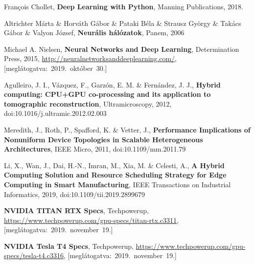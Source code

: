\begin{thebibliography}{9}
	François Chollet,
	\textbf{Deep Learning with Python},
	Manning Publications,
	2018.

	Altrichter Márta \& Horváth Gábor \& Pataki Béla \& Strausz György \& Takács Gábor \& Valyon József,
	\textbf{Neurális hálózatok},
	Panem,
	2006


	Michael A. Nielsen,
	\textbf{Neural Networks and Deep Learning},
	Determination Press,
	2015,
	{\footnotesize\url{http://neuralnetworksanddeeplearning.com/}},
	\mbox{[meglátogatva:~2019.~október~30.]}

	Agulleiro, J. I., Vázquez, F., Garzón, E. M. \& Fernández, J. J., \textbf{Hybrid computing: CPU+GPU co-processing and its application to tomographic reconstruction},
	Ultramicroscopy,
	2012,
	doi:10.1016/j.ultramic.2012.02.003 

	Meredith, J., Roth, P., Spafford, K. \& Vetter, J.,
	\textbf{Performance Implications of Nonuniform Device Topologies in Scalable Heterogeneous Architectures},
	IEEE Micro,
	2011,
	doi:10.1109/mm.2011.79 

	Li, X., Wan, J., Dai, H.-N., Imran, M., Xia, M. \& Celesti, A.,
	\textbf{A Hybrid Computing Solution and Resource Scheduling Strategy for Edge Computing in Smart Manufacturing},
	IEEE Transactions on Industrial Informatics,
	2019,
	doi:10.1109/tii.2019.2899679

	\textbf{NVIDIA TITAN RTX Specs},
	Techpowerup,
	{\footnotesize\url{https://www.techpowerup.com/gpu-specs/titan-rtx.c3311}},
	\mbox{[meglátogatva:~2019.~november~19.]}

	\textbf{NVIDIA Tesla T4 Specs},
	Techpowerup,
	{\footnotesize\url{https://www.techpowerup.com/gpu-specs/tesla-t4.c3316}},
	\mbox{[meglátogatva:~2019.~november~19.]}



\end{thebibliography}
